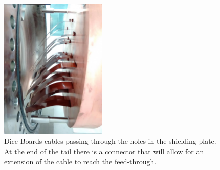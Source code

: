 \begin{figure}[hpt!]
\begin{center}
\includegraphics[width=0.45\textwidth]{TrackingPlane/IMG/cabling}
\caption{Dice-Boards cables passing through the holes in the shielding plate. At the end of the tail there is a connector that will allow for an extension of the cable to reach the feed-through.}
\label{fig:cabling}
\end{center}
\end{figure}

